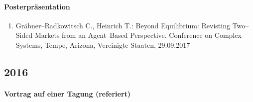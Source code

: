 \paragraph{Posterpräsentation}
\begin{enumerate}
	\item Gräbner--Radkowitsch C., Heinrich T.: Beyond Equilibrium: Revisting Two--Sided Markets from an Agent--Based Perspective. Conference on Complex Systems, Tempe, Arizona, Vereinigte Staaten, 29.09.2017
\end{enumerate}
\subsection*{2016}
\paragraph{Vortrag auf einer Tagung (referiert)}
